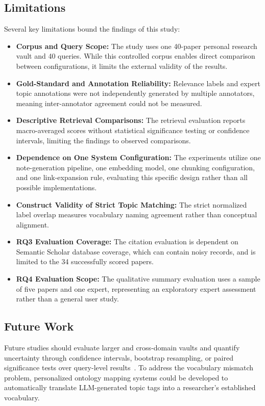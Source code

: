 \documentclass[runningheads]{llncs}
\begin{document}
\subsection{Limitations}
Several key limitations bound the findings of this study:
\begin{itemize}
    \item \textbf{Corpus and Query Scope:} The study uses one 40-paper personal research vault and 40 queries. While this controlled corpus enables direct comparison between configurations, it limits the external validity of the results.
    \item \textbf{Gold-Standard and Annotation Reliability:} Relevance labels and expert topic annotations were not independently generated by multiple annotators, meaning inter-annotator agreement could not be measured.
    \item \textbf{Descriptive Retrieval Comparisons:} The retrieval evaluation reports macro-averaged scores without statistical significance testing or confidence intervals, limiting the findings to observed comparisons.
    \item \textbf{Dependence on One System Configuration:} The experiments utilize one note-generation pipeline, one embedding model, one chunking configuration, and one link-expansion rule, evaluating this specific design rather than all possible implementations.
    \item \textbf{Construct Validity of Strict Topic Matching:} The strict normalized label overlap measures vocabulary naming agreement rather than conceptual alignment.
    \item \textbf{RQ3 Evaluation Coverage:} The citation evaluation is dependent on Semantic Scholar database coverage, which can contain noisy records, and is limited to the 34 successfully scored papers.
    \item \textbf{RQ4 Evaluation Scope:} The qualitative summary evaluation uses a sample of five papers and one expert, representing an exploratory expert assessment rather than a general user study.
\end{itemize}

\subsection{Future Work}
Future studies should evaluate larger and cross-domain vaults and quantify uncertainty through confidence intervals, bootstrap resampling, or paired significance tests over query-level results~\cite{urbano2019statistical}. To address the vocabulary mismatch problem, personalized ontology mapping systems could be developed to automatically translate LLM-generated topic tags into a researcher's established vocabulary. 
\end{document}
